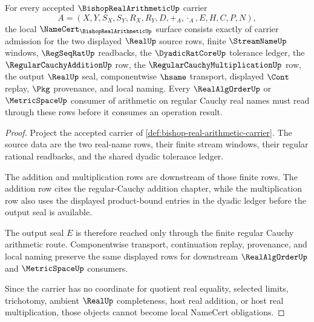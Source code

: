 \begin{theorem}
\label{thm:bishop-real-arithmetic-namecert-obligations}
For every accepted $\BishopRealArithmeticUp$ carrier
$$
A=(X,Y,S_X,S_Y,R_X,R_Y,D,+_A,\cdot_A,E,H,C,P,N),
$$
the local $\NameCert_{\BishopRealArithmeticUp}$ surface consists exactly of carrier admission for the two displayed $\RealUp$ source rows, finite $\StreamNameUp$ windows, $\RegSeqRatUp$ readbacks, the $\DyadicRatCoreUp$ tolerance ledger, the $\RegularCauchyAdditionUp$ row, the $\RegularCauchyMultiplicationUp$ row, the output $\RealUp$ seal, componentwise $\hsame$ transport, displayed $\Cont$ replay, $\Pkg$ provenance, and local naming. Every $\RealAlgOrderUp$ or $\MetricSpaceUp$ consumer of arithmetic on regular Cauchy real names must read through these rows before it consumes an operation result.
\end{theorem}
\begin{proof}
Project the accepted carrier of \autoref{def:bishop-real-arithmetic-carrier}. The source data are the two real-name rows, their finite stream windows, their regular rational readbacks, and the shared dyadic tolerance ledger.

The addition and multiplication rows are downstream of those finite rows. The addition row cites the regular-Cauchy addition chapter, while the multiplication row also uses the displayed product-bound entries in the dyadic ledger before the output seal is available.

The output seal $E$ is therefore reached only through the finite regular Cauchy arithmetic route. Componentwise transport, continuation replay, provenance, and local naming preserve the same displayed rows for downstream $\RealAlgOrderUp$ and $\MetricSpaceUp$ consumers.

Since the carrier has no coordinate for quotient real equality, selected limits, trichotomy, ambient $\RealUp$ completeness, host real addition, or host real multiplication, those objects cannot become local NameCert obligations.
\end{proof}

